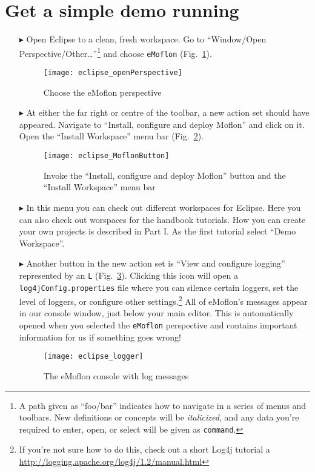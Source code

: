 \newpage
\genHeader

\section{Get a simple demo running}


\begin{itemize}
\hypertarget{simpleDemo common}{} 
\item[$\blacktriangleright$] Open Eclipse to a clean, fresh workspace. Go to ``Window/Open Perspective/Other\ldots''\footnote{A path given as ``foo/bar''
indicates how to navigate in a series of menus and toolbars. New definitions or concepts will be \emph{italicized}, and any data you're required to enter,
open, or select will be given as \texttt{command}.} and choose \texttt{eMoflon} (Fig.~\ref{eclipse:openPerspective}).

\begin{figure}[htbp]
	\centering
  \texttt{[image: eclipse\_openPerspective]}
	\caption{Choose the eMoflon perspective}
	\label{eclipse:openPerspective}
\end{figure} 

\item[$\blacktriangleright$] At either the far right or centre of the toolbar, a new action set should have appeared. Navigate to ``Install, configure and deploy Moflon'' and click on it. Open the  ``Install Workspace'' menu bar
(Fig.~\ref{eclipse:newMetamodel}).

\vspace{0.5cm}
\begin{figure}[htbp]
	\centering
  \texttt{[image: eclipse\_MoflonButton]}
	\caption{Invoke the ``Install, configure and deploy Moflon'' button and the ``Install Workspace'' menu bar}
	\label{eclipse:newMetamodel}
\end{figure}

\newpage

\item[$\blacktriangleright$] In this menu you can check out different workspaces for Eclipse. Here you can also check out worspaces for the handbook tutorials. How you can create your own projects is described in Part I. As the first tutorial select ``Demo Workspace''. 

\item[$\blacktriangleright$]  Another button in the new action set is ``View and configure logging'' represented by an \texttt{L} (Fig.~\ref{eclipse:logger}).
Clicking this icon will open a \texttt{log4jConfig.properties} file where you can silence certain loggers, set the level of loggers, or configure other
settings.\footnote{If you're not sure how to do this, check out a short Log4j tutorial a \url{http://logging.apache.org/log4j/1.2/manual.html}} All of eMoflon's
messages appear in our console window, just below your main editor. This is automatically opened when you selected the \texttt{eMoflon} perspective and
contains important information for us if something goes wrong!

\begin{figure}[htbp]
	\centering
  \texttt{[image: eclipse\_logger]}
	\caption{The eMoflon console with log messages}
	\label{eclipse:logger}
\end{figure} 
\end{itemize}



